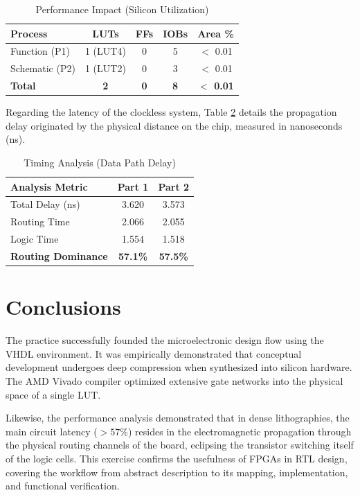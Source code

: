 \documentclass[conference]{IEEEtran}
\begin{document}
\begin{table}[htbp]
\caption{Performance Impact (Silicon Utilization)}
\begin{center}
\begin{tabular}{lcccc}
\toprule
\textbf{Process} & \textbf{LUTs} & \textbf{FFs} & \textbf{IOBs} & \textbf{Area \%} \\
\midrule
Function (P1) & 1 (LUT4) & 0 & 5 & $<$ 0.01 \\
Schematic (P2) & 1 (LUT2) & 0 & 3 & $<$ 0.01 \\
\midrule
\textbf{Total} & \textbf{2} & \textbf{0} & \textbf{8} & \textbf{$<$ 0.01} \\
\bottomrule
\end{tabular}
\label{tab4}
\end{center}
\end{table}

Regarding the latency of the clockless system, Table \ref{tab5} details the propagation delay originated by the physical distance on the chip, measured in nanoseconds (ns).

\begin{table}[htbp]
\caption{Timing Analysis (Data Path Delay)}
\begin{center}
\begin{tabular}{lcc}
\toprule
\textbf{Analysis Metric} & \textbf{Part 1} & \textbf{Part 2} \\
\midrule
Total Delay (ns) & 3.620 & 3.573 \\
Routing Time & 2.066 & 2.055 \\
Logic Time & 1.554 & 1.518 \\
\midrule
\textbf{Routing Dominance} & \textbf{57.1\%} & \textbf{57.5\%} \\
\bottomrule
\end{tabular}
\label{tab5}
\end{center}
\end{table}

\section{Conclusions}
The practice successfully founded the microelectronic design flow using the VHDL environment. It was empirically demonstrated that conceptual development undergoes deep compression when synthesized into silicon hardware. The AMD Vivado compiler optimized extensive gate networks into the physical space of a single LUT. 

Likewise, the performance analysis demonstrated that in dense lithographies, the main circuit latency ($>57\%$) resides in the electromagnetic propagation through the physical routing channels of the board, eclipsing the transistor switching itself of the logic cells. This exercise confirms the usefulness of FPGAs in RTL design, covering the workflow from abstract description to its mapping, implementation, and functional verification.
\end{document}
